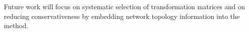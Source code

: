 

Future work will focus on systematic selection of transformation matrices and on reducing conservativeness by embedding network topology information into the method.



